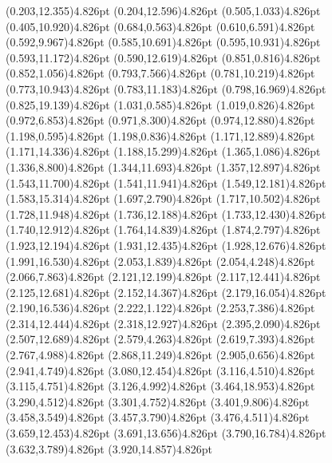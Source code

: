\documentclass[10pt]{article}
\begin{document}
{{\qdisk(0.203,12.355){4.826pt}%
\qdisk(0.204,12.596){4.826pt}%
\qdisk(0.505,1.033){4.826pt}%
\qdisk(0.405,10.920){4.826pt}%
\qdisk(0.684,0.563){4.826pt}%
\qdisk(0.610,6.591){4.826pt}%
\qdisk(0.592,9.967){4.826pt}%
\qdisk(0.585,10.691){4.826pt}%
\qdisk(0.595,10.931){4.826pt}%
\qdisk(0.593,11.172){4.826pt}%
\qdisk(0.590,12.619){4.826pt}%
\qdisk(0.851,0.816){4.826pt}%
\qdisk(0.852,1.056){4.826pt}%
\qdisk(0.793,7.566){4.826pt}%
\qdisk(0.781,10.219){4.826pt}%
\qdisk(0.773,10.943){4.826pt}%
\qdisk(0.783,11.183){4.826pt}%
\qdisk(0.798,16.969){4.826pt}%
\qdisk(0.825,19.139){4.826pt}%
\qdisk(1.031,0.585){4.826pt}%
\qdisk(1.019,0.826){4.826pt}%
\qdisk(0.972,6.853){4.826pt}%
\qdisk(0.971,8.300){4.826pt}%
\qdisk(0.974,12.880){4.826pt}%
\qdisk(1.198,0.595){4.826pt}%
\qdisk(1.198,0.836){4.826pt}%
\qdisk(1.171,12.889){4.826pt}%
\qdisk(1.171,14.336){4.826pt}%
\qdisk(1.188,15.299){4.826pt}%
\qdisk(1.365,1.086){4.826pt}%
\qdisk(1.336,8.800){4.826pt}%
\qdisk(1.344,11.693){4.826pt}%
\qdisk(1.357,12.897){4.826pt}%
\qdisk(1.543,11.700){4.826pt}%
\qdisk(1.541,11.941){4.826pt}%
\qdisk(1.549,12.181){4.826pt}%
\qdisk(1.583,15.314){4.826pt}%
\qdisk(1.697,2.790){4.826pt}%
\qdisk(1.717,10.502){4.826pt}%
\qdisk(1.728,11.948){4.826pt}%
\qdisk(1.736,12.188){4.826pt}%
\qdisk(1.733,12.430){4.826pt}%
\qdisk(1.740,12.912){4.826pt}%
\qdisk(1.764,14.839){4.826pt}%
\qdisk(1.874,2.797){4.826pt}%
\qdisk(1.923,12.194){4.826pt}%
\qdisk(1.931,12.435){4.826pt}%
\qdisk(1.928,12.676){4.826pt}%
\qdisk(1.991,16.530){4.826pt}%
\qdisk(2.053,1.839){4.826pt}%
\qdisk(2.054,4.248){4.826pt}%
\qdisk(2.066,7.863){4.826pt}%
\qdisk(2.121,12.199){4.826pt}%
\qdisk(2.117,12.441){4.826pt}%
\qdisk(2.125,12.681){4.826pt}%
\qdisk(2.152,14.367){4.826pt}%
\qdisk(2.179,16.054){4.826pt}%
\qdisk(2.190,16.536){4.826pt}%
\qdisk(2.222,1.122){4.826pt}%
\qdisk(2.253,7.386){4.826pt}%
\qdisk(2.314,12.444){4.826pt}%
\qdisk(2.318,12.927){4.826pt}%
\qdisk(2.395,2.090){4.826pt}%
\qdisk(2.507,12.689){4.826pt}%
\qdisk(2.579,4.263){4.826pt}%
\qdisk(2.619,7.393){4.826pt}%
\qdisk(2.767,4.988){4.826pt}%
\qdisk(2.868,11.249){4.826pt}%
\qdisk(2.905,0.656){4.826pt}%
\qdisk(2.941,4.749){4.826pt}%
\qdisk(3.080,12.454){4.826pt}%
\qdisk(3.116,4.510){4.826pt}%
\qdisk(3.115,4.751){4.826pt}%
\qdisk(3.126,4.992){4.826pt}%
\qdisk(3.464,18.953){4.826pt}%
\qdisk(3.290,4.512){4.826pt}%
\qdisk(3.301,4.752){4.826pt}%
\qdisk(3.401,9.806){4.826pt}%
\qdisk(3.458,3.549){4.826pt}%
\qdisk(3.457,3.790){4.826pt}%
\qdisk(3.476,4.511){4.826pt}%
\qdisk(3.659,12.453){4.826pt}%
\qdisk(3.691,13.656){4.826pt}%
\qdisk(3.790,16.784){4.826pt}%
\qdisk(3.632,3.789){4.826pt}%
\qdisk(3.920,14.857){4.826pt}%
}}
\end{document}
